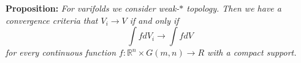 \documentclass{article}
\begin{document}
\vspace{2ex}
\textbf{Proposition:} \textit{For varifolds we consider weak-$*$ topology. Then we have a
convergence criteria that $V_i\rightarrow V$ if and only if
\[\int fdV_i\rightarrow\int fdV\]
for every continuous function $f:\mathbb{R}^n\times G(m,n)\rightarrow R$ with a
compact support.}
\vspace{1ex}

\medskip


\end{document}
